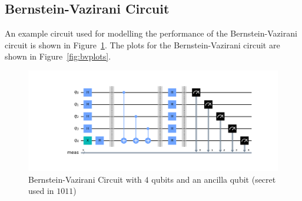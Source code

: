 \documentclass[11pt]{article}
\begin{document}
\subsection{Bernstein-Vazirani Circuit}
An example circuit used for modelling the performance of the Bernstein-Vazirani circuit is shown in Figure~\ref{fig:bv}. The plots for the Bernstein-Vazirani circuit are shown in Figure~\ref{fig:bvplots}.
\begin{figure}[hbtp]
    \centering
    \includegraphics[width=0.75\linewidth]{outputs/bv.png}
    \caption{Bernstein-Vazirani Circuit with $4$ qubits and an ancilla qubit (secret used in $1011$)}
    \label{fig:bv}
\end{figure}
\end{document}
